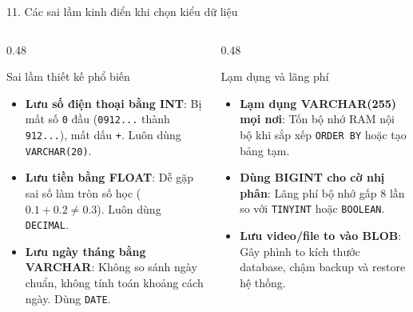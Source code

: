 \documentclass[aspectratio=169,11pt]{beamer}
\begin{document}
\begin{frame}{11. Các sai lầm kinh điển khi chọn kiểu dữ liệu}
\begin{columns}[t]
  \begin{column}{0.48\textwidth}
    \begin{alertblock}{Sai lầm thiết kế phổ biến}
      \begin{itemize}\setlength{\itemsep}{2pt}
        \item \textbf{Lưu số điện thoại bằng INT}: Bị mất số \texttt{0} đầu (\texttt{0912...} thành \texttt{912...}), mất dấu \texttt{+}. Luôn dùng \texttt{VARCHAR(20)}.
        \item \textbf{Lưu tiền bằng FLOAT}: Dễ gặp sai số làm tròn số học ($0.1 + 0.2 \ne 0.3$). Luôn dùng \texttt{DECIMAL}.
        \item \textbf{Lưu ngày tháng bằng VARCHAR}: Không so sánh ngày chuẩn, không tính toán khoảng cách ngày. Dùng \texttt{DATE}.
      \end{itemize}
    \end{alertblock}
  \end{column}
  \begin{column}{0.48\textwidth}
    \begin{alertblock}{Lạm dụng và lãng phí}
      \begin{itemize}\setlength{\itemsep}{2pt}
        \item \textbf{Lạm dụng VARCHAR(255) mọi nơi}: Tốn bộ nhớ RAM nội bộ khi sắp xếp \texttt{ORDER BY} hoặc tạo bảng tạm.
        \item \textbf{Dùng BIGINT cho cờ nhị phân}: Lãng phí bộ nhớ gấp 8 lần so với \texttt{TINYINT} hoặc \texttt{BOOLEAN}.
        \item \textbf{Lưu video/file to vào BLOB}: Gây phình to kích thước database, chậm backup và restore hệ thống.
      \end{itemize}
    \end{alertblock}
  \end{column}
\end{columns}
\end{frame}
\end{document}
